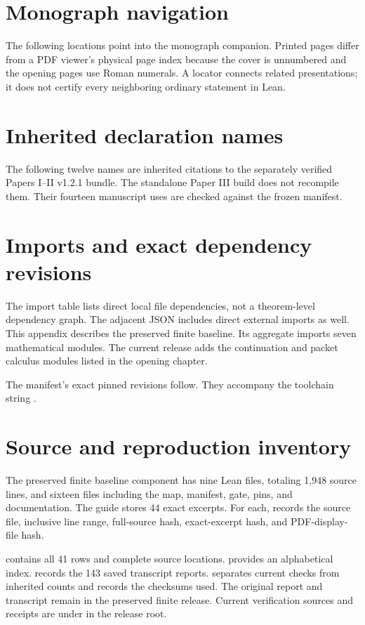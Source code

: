 \section{Monograph navigation}\label{app:crosswalk}
The following locations point into the monograph companion. Printed pages differ from a PDF viewer's physical page index because the cover is unnumbered and the opening pages use Roman numerals. A locator connects related presentations; it does not certify every neighboring ordinary statement in Lean.

\section{Inherited declaration names}\label{app:inherited}
The following twelve names are inherited citations to the separately verified Papers I--II v1.2.1 bundle. The standalone Paper III build does not recompile them. Their fourteen manuscript uses are checked against the frozen manifest.

\clearpage
\section{Imports and exact dependency revisions}
The import table lists direct local file dependencies, not a theorem-level dependency graph. The adjacent JSON includes direct external imports as well. This appendix describes the preserved finite baseline. Its aggregate imports seven mathematical modules. The current release adds the continuation and packet calculus modules listed in the opening chapter.

The manifest's exact pinned revisions follow. They accompany the toolchain string .

\clearpage
\section{Source and reproduction inventory}
The preserved finite baseline component has nine Lean files, totaling 1,948 source lines, and sixteen files including the map, manifest, gate, pins, and documentation. The guide stores 44 exact excerpts. For each,  records the source file, inclusive line range, full-source hash, exact-excerpt hash, and PDF-display-file hash.

 contains all 41 rows and complete source locations.  provides an alphabetical index.  records the 143 saved transcript reports.  separates current checks from inherited counts and records the checksums used. The original report and transcript remain in the preserved finite release. Current verification sources and receipts are under  in the release root.

